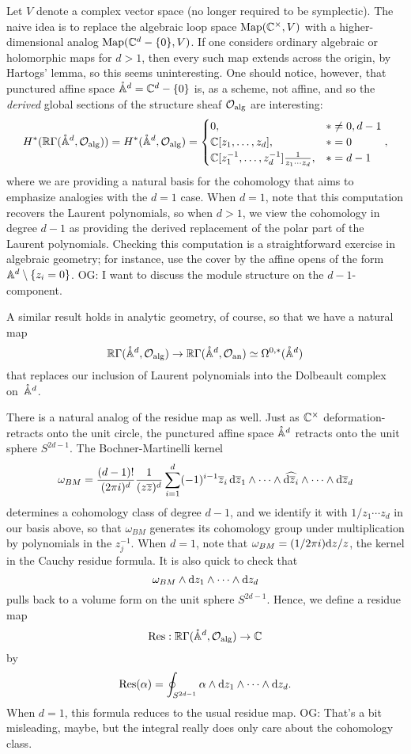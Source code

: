 \documentclass[11pt]{amsart}
\def\pAA{\mathring{\AA}}
\def\owen#1{{\textcolor{violet!65!black}{OG: {#1}}}}
\begin{document}
Let $V$ denote a complex vector space (no longer required to be symplectic).
The naive idea is to replace the algebraic loop space $\Map(\CC^\times,  V)$ with a higher-dimensional analog $\Map(\CC^d -\{0\}, V)$.
If one considers ordinary algebraic or holomorphic maps for $d > 1$, 
then every such map extends across the origin, by Hartogs' lemma,
so this seems uninteresting.
One should notice, however, that punctured affine space $\mathring{\AA}^d = \CC^d -\{0\}$ is, as a scheme, not affine, 
and so the {\em derived} global sections of the structure sheaf $\cO_{\rm alg}$ are interesting:
\[
H^*(\RR \Gamma(\pAA^d, \cO_{\rm alg})) = H^* (\mathring{\AA}^d, \cO_{\rm alg}) 
= \begin{cases} 
0, & * \neq 0, d-1 \\ 
\CC[z_1,\ldots,z_d], & * = 0 \\ 
\CC[z_1^{-1},\ldots,z_d^{-1}] \frac{1}{z_1 \cdots z_d}, & * = d-1 
\end{cases},
\]
where we are providing a natural basis for the cohomology 
that aims to emphasize analogies with the $d=1$ case.
When $d=1$, note that this computation recovers the Laurent polynomials,
so when $d > 1$, 
we view the cohomology in degree $d-1$ as providing the derived replacement of the polar part of the Laurent polynomials.
Checking this computation is a straightforward exercise in algebraic geometry;
for instance, use the cover by the affine opens of the form $\AA^d \setminus \{z_i =0\}$.
\owen{I want to discuss the module structure on the $d-1$-component.}

A similar result holds in analytic geometry, of course,
so that we have a natural map
\[
\RR \Gamma(\pAA^d, \cO_{\rm alg}) \to \RR \Gamma(\pAA^d, \cO_{\rm an}) \simeq \Omega^{0,*}(\pAA^d)
\]
that replaces our inclusion of Laurent polynomials into the Dolbeault complex on~$\pAA^d$.

There is a natural analog of the residue map as well.
Just as $\CC^\times$ deformation-retracts onto the unit circle,
the punctured affine space $\pAA^d$ retracts onto the unit sphere $S^{2d-1}$.
The Bochner-Martinelli kernel 
\[
\omega_{BM} = \frac{(d-1)!}{(2 \pi i)^d} \frac{1}{(z\zbar)^d} \sum_{i=1}^d (-1)^{i-1} \zbar_i\, \d \zbar_1 \wedge \cdots \wedge \Hat{\d \zbar_i} \wedge \cdots \wedge \d \zbar_d
\]
determines a cohomology class of degree $d-1$, and we identify it with $1/z_1 \cdots z_d$ in our basis above,
so that $\omega_{BM}$ generates its cohomology group under multiplication by polynomials in the $z_j^{-1}$.
When $d = 1$, note that $\omega_{BM} = (1/2\pi i)\d z/z$, the kernel in the Cauchy residue formula.
It is also quick to check that
\[
\omega_{BM} \wedge \d z_1 \wedge \cdots \wedge \d z_d
\]
pulls back to a volume form on the unit sphere $S^{2d-1}$.
Hence, we define a residue map
\[
\Res: \RR \Gamma(\pAA^d, \cO_{\rm alg})  \to \CC
\]
by
\[
\Res(\alpha) = \oint_{S^{2d-1}} \alpha \wedge \d z_1 \wedge \cdots \wedge \d z_d.
\]
When $d =1$, this formula reduces to the usual residue map.
\owen{That's a bit misleading, maybe, but the integral really does only care about the cohomology class.}
\end{document}
